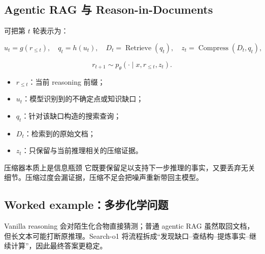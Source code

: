 \documentclass[a4paper]{article}
\begin{document}
\subsection{Agentic RAG 与 Reason-in-Documents}


可把第 $t$ 轮表示为：

$$
u_t=g(r_{\le t}),\quad
q_t=h(u_t),\quad
D_t=\operatorname{Retrieve}(q_t),\quad
z_t=\operatorname{Compress}(D_t,q_t),
$$

$$
r_{t+1}\sim p_\theta(\cdot\mid x,r_{\le t},z_t).
$$

\begin{itemize}
    \item $r_{\le t}$：当前 reasoning 前缀；
    \item $u_t$：模型识别到的不确定点或知识缺口；
    \item $q_t$：针对该缺口构造的搜索查询；
    \item $D_t$：检索到的原始文档；
    \item $z_t$：只保留与当前推理相关的压缩证据。
\end{itemize}



\begin{knowledgebox}{压缩器本质上是信息瓶颈}
它既要保留足以支持下一步推理的事实，又要丢弃无关细节。压缩过度会漏证据，压缩不足会把噪声重新带回主模型。
\end{knowledgebox}

\subsection{Worked example：多步化学问题}


Vanilla reasoning 会对陌生化合物直接猜测；普通 agentic RAG 虽然取回文档，但长文本可能打断原推理。Search-o1 将流程拆成“发现缺口--查结构--提炼事实--继续计算”，因此最终答案更稳定。
\end{document}
